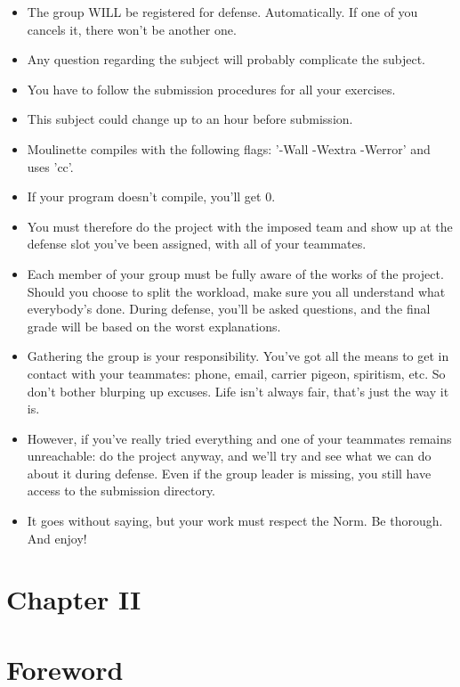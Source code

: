 \documentclass[12pt]{article}
\begin{document}
\begin{itemize}
  \item The group WILL be registered for defense. Automatically. If one of you cancels it, there won't be another one.
  \item Any question regarding the subject will probably complicate the subject.
  \item You have to follow the submission procedures for all your exercises.
  \item This subject could change up to an hour before submission.
  \item Moulinette compiles with the following flags: '-Wall -Wextra -Werror' and uses 'cc'.
  \item If your program doesn't compile, you'll get 0.
  \item You must therefore do the project with the imposed team and show up at the defense slot you've been assigned, with all of your teammates.
  \item Each member of your group must be fully aware of the works of the project. Should you choose to split the workload, make sure you all understand what everybody's done. During defense, you'll be asked questions, and the final grade will be based on the worst explanations.
  \item Gathering the group is your responsibility. You've got all the means to get in contact with your teammates: phone, email, carrier pigeon, spiritism, etc. So don't bother blurping up excuses. Life isn't always fair, that's just the way it is.
  \item However, if you've really tried everything and one of your teammates remains unreachable: do the project anyway, and we'll try and see what we can do about it during defense. Even if the group leader is missing, you still have access to the submission directory.
  \item It goes without saying, but your work must respect the Norm. Be thorough. And enjoy!
\end{itemize}

\newpage

\section*{\LARGE Chapter II}
\section*{\LARGE Foreword}
\end{document}
